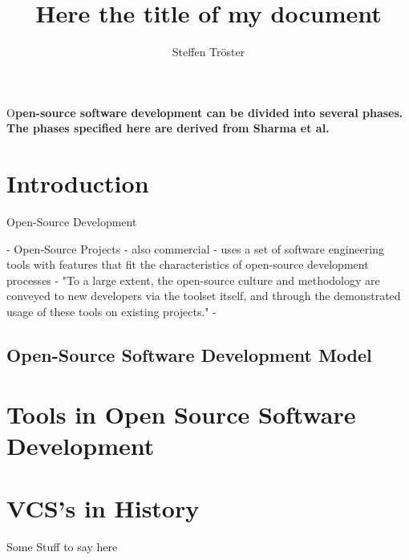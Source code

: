 \documentclass[DIV=calc,paper=a4,fontsize=11pt,twocolumn]{scrartcl}
\title{Here the title of my document}					%
\author{Steffen Tröster \\}											%
\date{}																%
\newcommand{\initial}[1]{%
     \lettrine[lines=3,lhang=0.3,nindent=0em]{
                    \color{DarkGoldenrod}
                    {\textsf{#1}}}{}}
\begin{document}
\maketitle
\thispagestyle{fancy}		%
\initial{O}\textbf{pen-source software development can be divided into several phases. The phases specified here are derived from Sharma et al. \citep{ZitovaF03}}

\section{Introduction}

Open-Source Development 

 - Open-Source Projects
 - also commercial
 - uses a set of software engineering tools with features that fit the characteristics of open-source development processes
 - "To a large extent, the open-source culture and methodology are conveyed to new developers via the toolset itself, and through the demonstrated usage of these tools on existing projects."
 - 

\subsection{Open-Source Software Development Model}

\section{Tools in Open Source Software Development}



\section{VCS's in History}
Some Stuff to say here



\end{document}
